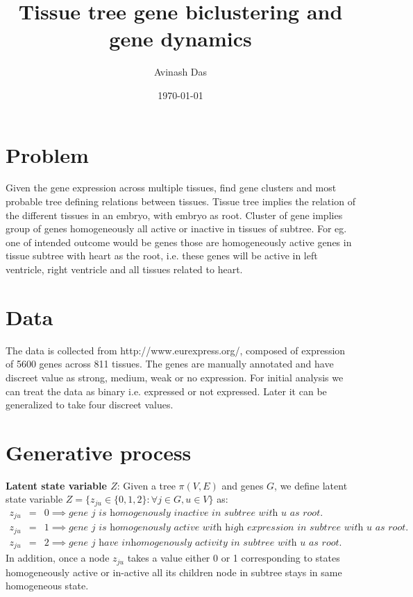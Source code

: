 \documentclass{article}
\title{
Tissue tree gene biclustering and gene dynamics
}
\author{Avinash Das}
\date{\today}
\begin{document}
\pagestyle{fancy}

\maketitle

\section{Problem}
Given the gene expression across multiple tissues, find gene clusters and most probable tree defining relations between tissues.  
Tissue tree implies the relation of the different tissues in an embryo, with embryo as root. Cluster of gene implies  
group of genes homogeneously all active or inactive in tissues of subtree. For eg. one of intended outcome would be genes those
are homogeneously active genes in tissue subtree with heart as the root, i.e. these genes will be active in left ventricle, right ventricle
and all tissues related to heart.


\section{Data}
The data is collected from http://www.eurexpress.org/, composed of expression of 5600 genes across 811 tissues. The genes are manually annotated and have discreet value as strong, medium, weak or no expression. 
For initial analysis we can treat the data as binary i.e. expressed or not expressed. Later it can be generalized to take four discreet values. 

\section{Generative process}

\par \textbf{Latent state variable $Z$}:
Given a tree $\pi(V,E)$ and genes $G$, we define latent state variable $Z= \{z_{ju} \in\{0,1,2\} : \forall j \in G, u \in V\}$ as:
\begin{eqnarray}
	z_{ju} &=& 0 \implies \textit{gene $j$ is homogenously inactive in subtree with $u$ as root.} \nonumber\\ 
	z_{ju} &=& 1 \implies \textit{gene $j$ is homogenously active with high expression in subtree with  $u$ as root.} \nonumber \\
	z_{ju} &=& 2 \implies \textit{gene $j$ have inhomogenously activity in subtree with $u$ as root.} \nonumber 
\end{eqnarray}
In addition, once a node $z_{ju}$ takes a value either 0 or 1 corresponding to states homogeneously active or in-active all its children 
node in subtree stays in same homogeneous state. 
\end{document}

